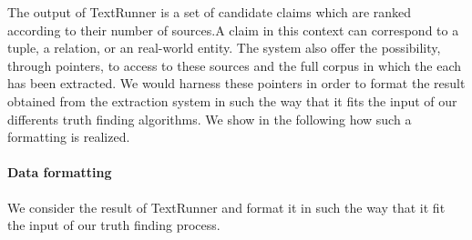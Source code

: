 The output of TextRunner is a set of candidate claims which are ranked according to their number of sources.A claim in this
context can correspond to a tuple, a relation, or an real-world entity.
The system also offer the possibility, through pointers, to access to these sources and the full corpus in which the each
has been extracted. We would harness these pointers in order to format the result obtained from the extraction system  in
such the way that it fits the input of our differents truth finding algorithms. We show in the following how such a 
formatting is realized.

\paragraph*{Data formatting}
We consider the result of TextRunner and format it in such the way 
that it fit the input of our truth finding process.